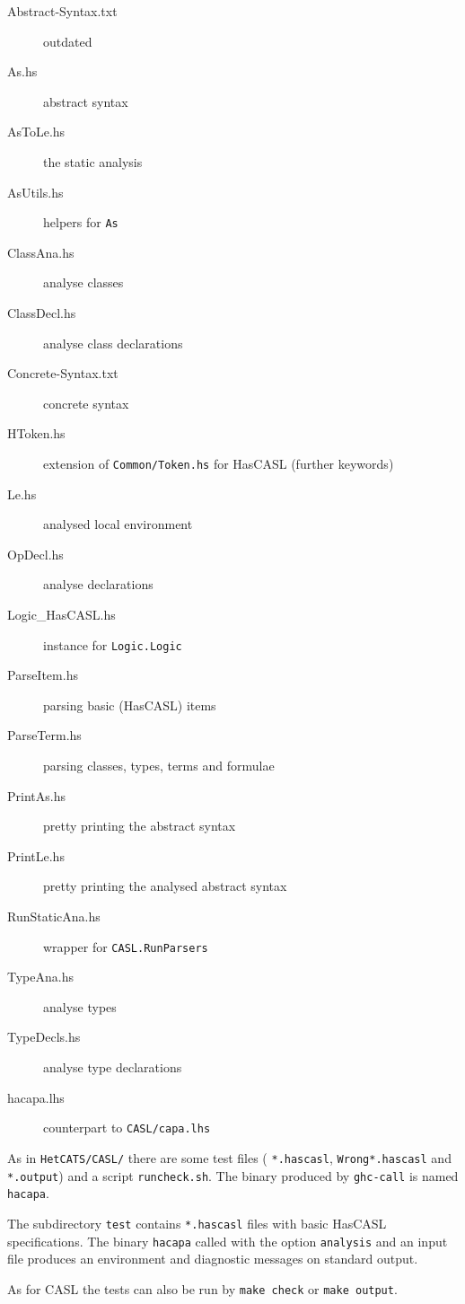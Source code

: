 \documentclass{article}
\begin{document}
\begin{description}
\item[Abstract-Syntax.txt] outdated
\item[As.hs] abstract syntax
\item[AsToLe.hs] the static analysis
\item[AsUtils.hs] helpers for \texttt{As}
\item[ClassAna.hs] analyse classes
\item[ClassDecl.hs] analyse class declarations
\item[Concrete-Syntax.txt] concrete syntax
\item[HToken.hs] extension of \texttt{Common/Token.hs} for HasCASL
  (further keywords)
\item[Le.hs] analysed local environment
\item[OpDecl.hs] analyse declarations
\item[Logic\_HasCASL.hs] instance for \texttt{Logic.Logic}
\item[ParseItem.hs] parsing basic (HasCASL) items
\item[ParseTerm.hs] parsing classes, types, terms and formulae
\item[PrintAs.hs] pretty printing the abstract syntax
\item[PrintLe.hs] pretty printing the analysed abstract syntax
\item[RunStaticAna.hs] wrapper for \texttt{CASL.RunParsers}
\item[TypeAna.hs] analyse types
\item[TypeDecls.hs] analyse type declarations
\item[hacapa.lhs] counterpart to \texttt{CASL/capa.lhs} 
\end{description}

As in \texttt{HetCATS/CASL/} there are some test files (
\texttt{*.hascasl}, \texttt{Wrong*.hascasl} and \texttt{*.output}) and a
script \texttt{runcheck.sh}. The binary produced by \texttt{ghc-call}
is named \texttt{hacapa}.

The subdirectory \texttt{test} contains \texttt{*.hascasl} files with basic
HasCASL specifications. The binary \texttt{hacapa} called with the option
\texttt{analysis} and an input file produces an environment and diagnostic
messages on standard output. 

As for CASL the tests can also be run by \texttt{make check} or 
\texttt{make output}.
\end{document}
